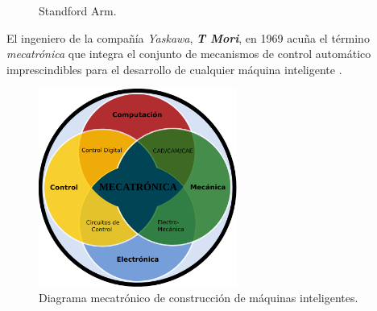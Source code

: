 \begin{itemize}
  \begin{figure}[h!]
    \begin{center}
      \subcapcentertrue
      \hspace{2mm}
    \end{center}
    \caption{Standford Arm.}
    \label{fig:standford_arm}
  \end{figure}

  El ingeniero de la compañía \emph{Yaskawa}, \textbf{\emph{T Mori}}, en 1969 acuña el término \emph{mecatrónica} que integra el conjunto de mecanismos de control automático imprescindibles para el desarrollo de cualquier máquina inteligente \cite{Sanchez07b}.
  
  \begin{figure} [h!]
    \begin{center}
      \includegraphics[width=65mm]{figs/meca.png}
    \end{center}
    \caption{Diagrama mecatrónico de construcción de máquinas inteligentes.}
    \label{fig:Mecatrónica}
  \end{figure}
  

\end{itemize}
